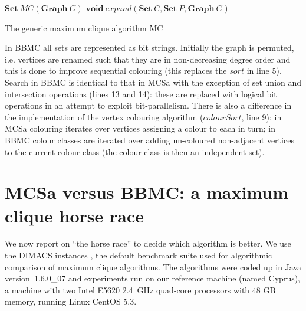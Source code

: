 \documentclass[runningheads]{llncs}
\begin{document}
\begin{algorithm}
\DontPrintSemicolon
\nl $\textbf{Set} ~ MC(\textbf{Graph} ~ G)$ \;
\nl {}
\;
\nl $\textbf{void}~expand(\textbf{Set}~C,\textbf{Set}~P,\textbf{Graph}~G)$ \;
\nl {}
\caption{The generic maximum clique algorithm MC}
\label{mc}
\end{algorithm}



In BBMC all sets are represented as bit strings. Initially the graph is permuted, i.e. vertices are renamed such that they are in 
non-decreasing degree order and this is done to improve sequential colouring (this replaces the $sort$ in line 5). 
Search in BBMC is identical to that in MCSa with the exception of  set union and intersection operations (lines 13 and 14): these are 
replaced with logical bit operations in an attempt to exploit bit-parallelism. There is also a 
difference in the implementation of the vertex colouring algorithm ($colourSort$, line 9): in MCSa colouring iterates over vertices assigning 
a colour to each in turn; in BBMC colour classes are iterated over adding un-coloured non-adjacent vertices to the current colour class
(the colour class is then an independent set).

\section{MCSa versus BBMC: a maximum clique horse race}
\vspace{-1.5mm}
We now report on ``the horse race'' to decide which algorithm is better. We use the DIMACS instances \cite{DIMACS},
the default benchmark suite used for algorithmic comparison of maximum clique algorithms.
The algorithms were coded up in Java \mbox{version 1.6.0\_07} and experiments run on our reference machine (named Cyprus), 
a machine with two Intel E5620 2.4~GHz quad-core processors with 48 GB memory, running Linux CentOS 5.3.
\end{document}
